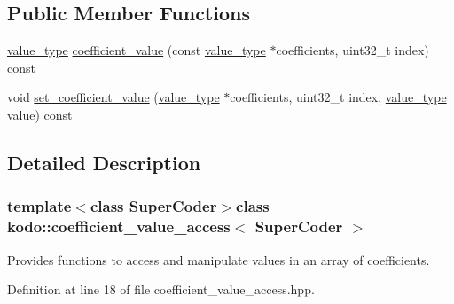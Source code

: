 \subsection*{Public Member Functions}
\begin{DoxyCompactItemize}
\item 
\hyperlink{classkodo_1_1coefficient__value__access_a629750d630f4188d48eb49f76cf750f1}{value\-\_\-type} \hyperlink{classkodo_1_1coefficient__value__access_a3108f4ac6b1dde7d14379d5b66c1a3c4}{coefficient\-\_\-value} (const \hyperlink{classkodo_1_1coefficient__value__access_a629750d630f4188d48eb49f76cf750f1}{value\-\_\-type} $\ast$coefficients, uint32\-\_\-t index) const 
\begin{DoxyCompactList}\small\item\em \end{DoxyCompactList}\item 
void \hyperlink{classkodo_1_1coefficient__value__access_a51e2e4236d4eaa2fba26d092f822c4d0}{set\-\_\-coefficient\-\_\-value} (\hyperlink{classkodo_1_1coefficient__value__access_a629750d630f4188d48eb49f76cf750f1}{value\-\_\-type} $\ast$coefficients, uint32\-\_\-t index, \hyperlink{classkodo_1_1coefficient__value__access_a629750d630f4188d48eb49f76cf750f1}{value\-\_\-type} value) const 
\begin{DoxyCompactList}\small\item\em \end{DoxyCompactList}\end{DoxyCompactItemize}


\subsection{Detailed Description}
\subsubsection*{template$<$class Super\-Coder$>$class kodo\-::coefficient\-\_\-value\-\_\-access$<$ Super\-Coder $>$}

Provides functions to access and manipulate values in an array of coefficients. 

Definition at line 18 of file coefficient\-\_\-value\-\_\-access.\-hpp.



